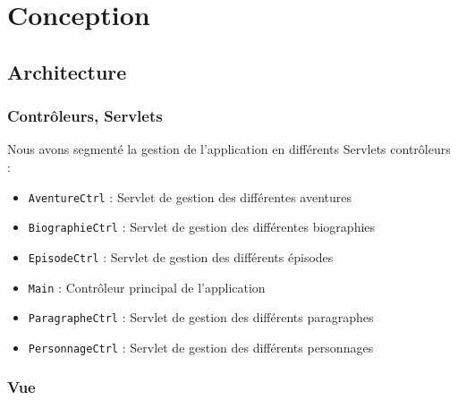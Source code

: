 \documentclass[a4paper, 11pt, titlepage]{article}
\begin{document}

\newpage

\section {Conception}

\subsection {Architecture}

\subsubsection {Contrôleurs, Servlets}

Nous avons segmenté la gestion de l'application en différents Servlets contrôleurs :
\begin{itemize}
\item
\lstinline!AventureCtrl! : Servlet de gestion des différentes aventures

\item
\lstinline!BiographieCtrl! : Servlet de gestion des différentes biographies

\item
\lstinline!EpisodeCtrl! : Servlet de gestion des différents épisodes

\item
\lstinline!Main! : Contrôleur principal de l'application

\item
\lstinline!ParagrapheCtrl! : Servlet de gestion des différents paragraphes

\item
\lstinline!PersonnageCtrl! : Servlet de gestion des différents personnages
\end{itemize}


\subsubsection {Vue}
\end{document}
